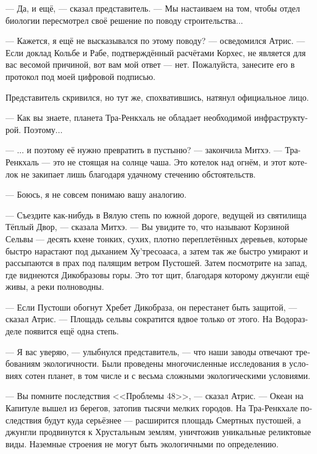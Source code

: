 \documentclass[a4paper,12pt,fleqn]{book}\usepackage{polyglossia}\setdefaultlanguage[babelshorthands=true]{russian}\setotherlanguage{english}\defaultfontfeatures{Ligatures=TeX,Mapping=tex-text}\usepackage{xcolor}\newcommand{\ml}[3]{#2}
\newcommand{\Aatris}{\"{A}\={a}tr\v{\i}s}
\newcommand{\Mitchoe}{M\={\i}tcho\^{e}}
\begin{document}
{--- Да, и ещё, --- сказал представитель.
--- Мы настаиваем на том, чтобы отдел биологии пересмотрел своё решение по поводу строительства...

--- Кажется, я ещё не высказывался по этому поводу? --- осведомился Атрис.
--- Если доклад Кольбе и Рабе, подтверждённый расчётами Корхес, не является для вас весомой причиной, вот вам мой ответ --- нет.
Пожалуйста, занесите его в протокол под моей цифровой подписью.

Представитель скривился, но тут же, спохватившись, натянул официальное лицо.

\ml{$0-[ej]$}
{--- Как вы знаете, планета Тра-Ренкхаль не обладает необходимой инфраструктурой.}
{``As you know, there's no necessary infrastructure on the planet Tr\r{a}-R\={e}nkch\'{a}l.}
\ml{$0-[ej]$}
{Поэтому...}
{Therefore---''}

\ml{$0-[ej]$}
{---  ... и поэтому её нужно превратить в пустыню? --- закончила Митхэ.}
{``---therefore, it should be turned into desert?'' \Mitchoe\ finished.}
--- Тра-Ренкхаль --- это не стоящая на солнце чаша.
Это котелок над огнём, и этот котелок не закипает лишь благодаря удачному стечению обстоятельств.

\ml{$0-[ej]$}
{--- Боюсь, я не совсем понимаю вашу аналогию.}
{``I'm afraid your analogy was not understood.''}

--- Съездите как-нибудь в Вялую степь по южной дороге, ведущей из святилища Тёплый Двор, --- сказала Митхэ.
--- Вы увидите то, что называют Корзиной Сельвы --- десять кхене тонких, сухих, плотно переплетённых деревьев, которые быстро нарастают под дыханием Ху'тресоааса, а затем так же быстро умирают и рассыпаются в прах под палящим ветром Пустошей.
Затем посмотрите на запад, где виднеются Дикобразовы горы.
Это тот щит, благодаря которому джунгли ещё живы, а реки полноводны.

\ml{$0-[ej]$}
{--- Если Пустоши обогнут Хребет Дикобраза, он перестанет быть защитой, --- сказал Атрис.}
{``If the Deadlands get around the Hedgehog Spine, there will be no shield anymore,'' \Aatris\ said.}
--- Площадь сельвы сократится вдвое только от этого.
На Водоразделе появится ещё одна степь.

--- Я вас уверяю, --- улыбнулся представитель, --- что наши заводы отвечают требованиям экологичности.
Были проведены многочисленные исследования в условиях сотен планет, в том числе и с весьма сложными экологическими условиями.

--- Вы помните последствия <<Проблемы 48>>, --- сказал Атрис.
--- Океан на Капитуле вышел из берегов, затопив тысячи мелких городов.
На Тра-Ренкхале последствия будут куда серьёзнее --- расширится площадь Смертных пустошей, а джунгли продвинутся к Хрустальным землям, уничтожив уникальные реликтовые виды.
Наземные строения не могут быть экологичными по определению.

}
\end{document}
